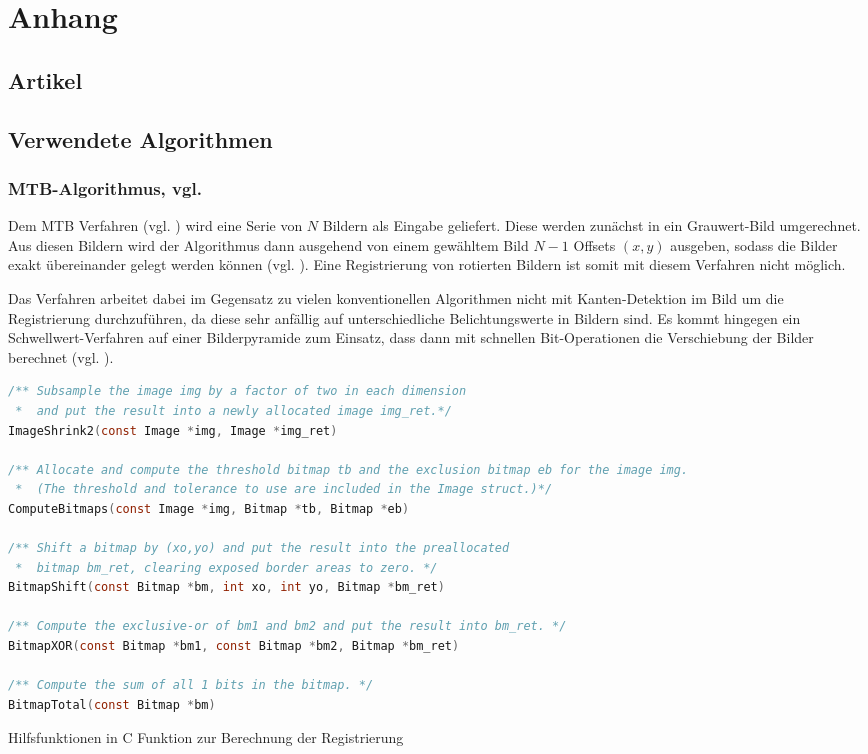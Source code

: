 \chapter{Anhang}
\section{Artikel \cite{paper}}
 
\section{Verwendete Algorithmen}

\subsection{MTB-Algorithmus, vgl. \cite[S.9 f]{Ward03fast}}
\label{subsec:MTB}
Dem \gls{MTB} Verfahren (vgl. \cite{Ward03fast}) wird eine Serie von $N$ Bildern als Eingabe geliefert. Diese werden zunächst in ein Grauwert-Bild umgerechnet. Aus diesen Bildern wird der Algorithmus dann ausgehend von einem gewähltem Bild $N-1$ Offsets $(x,y)$ ausgeben, sodass die Bilder exakt übereinander gelegt werden können (vgl. \cite[S. 123f]{Reinhard}). Eine Registrierung von rotierten Bildern ist somit mit diesem Verfahren nicht möglich. 

Das Verfahren arbeitet dabei im Gegensatz zu vielen konventionellen Algorithmen nicht mit Kanten-Detektion im Bild um die Registrierung durchzuführen, da diese sehr anfällig auf unterschiedliche Belichtungswerte in Bildern sind. Es kommt hingegen ein Schwellwert-Verfahren auf einer Bilderpyramide zum Einsatz, dass dann mit schnellen Bit-Operationen die Verschiebung der Bilder berechnet (vgl. \cite{Ward03fast}). 

\begin{Listing}[H]
\label{lst:MTB:helpers}
\begin{lstlisting}[language=c]
/** Subsample the image img by a factor of two in each dimension 
 *  and put the result into a newly allocated image img_ret.*/
ImageShrink2(const Image *img, Image *img_ret)

/** Allocate and compute the threshold bitmap tb and the exclusion bitmap eb for the image img. 
 *  (The threshold and tolerance to use are included in the Image struct.)*/
ComputeBitmaps(const Image *img, Bitmap *tb, Bitmap *eb)

/** Shift a bitmap by (xo,yo) and put the result into the preallocated 
 *  bitmap bm_ret, clearing exposed border areas to zero. */
BitmapShift(const Bitmap *bm, int xo, int yo, Bitmap *bm_ret)

/** Compute the exclusive-or of bm1 and bm2 and put the result into bm_ret. */
BitmapXOR(const Bitmap *bm1, const Bitmap *bm2, Bitmap *bm_ret)

/** Compute the sum of all 1 bits in the bitmap. */
BitmapTotal(const Bitmap *bm)
\end{lstlisting}
\caption{Hilfsfunktionen in C Funktion zur Berechnung der Registrierung \cite{Ward03fast}}

\end{Listing}

